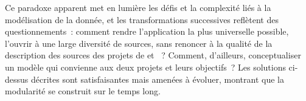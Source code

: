 Ce paradoxe apparent met en lumière les défis et la complexité liés à la
modélisation de la donnée, et les transformations successives reflètent
des questionnements~: comment rendre l'application la plus universelle
possible, l'ouvrir à une large diversité de sources, sans renoncer à la
qualité de la description des sources des projets de \eida et \vhs~?
Comment, d'ailleurs, conceptualiser un modèle qui convienne aux deux
projets et leurs objectifs~? Les solutions ci-dessus décrites sont
satisfaisantes mais amenées à évoluer, montrant que la modularité se
construit sur le temps long.